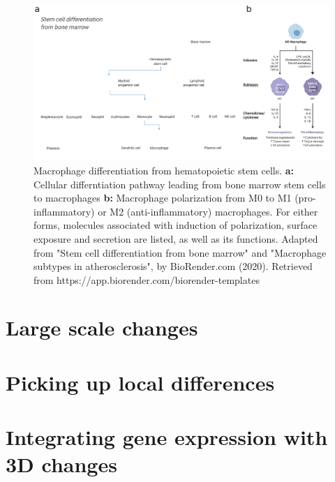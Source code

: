 \begin{figure}[htb]
    \includegraphics[width=\textwidth]{Parts/Part02/gfx/macrophage_differentiation.pdf}
    \caption[Macrophage differentiation.]{Macrophage differentiation from hematopoietic stem cells. \textbf{a:} Cellular differntiation pathway leading from bone marrow stem cells to macrophages \textbf{b:} Macrophage polarization from M0 to M1 (pro-inflammatory) or M2 (anti-inflammatory) macrophages. For either forms, molecules associated with induction of polarization, surface exposure and secretion are listed, as well as its functions.  Adapted from "Stem cell differentiation from bone marrow" and "Macrophage subtypes in atherosclerosis", by BioRender.com (2020). Retrieved from https://app.biorender.com/biorender-templates}
    \label{fig:02-03:macrophage}
\end{figure}

\section{Large scale changes}

\section{Picking up local differences}

\section{Integrating gene expression with 3D changes}

\blindtext